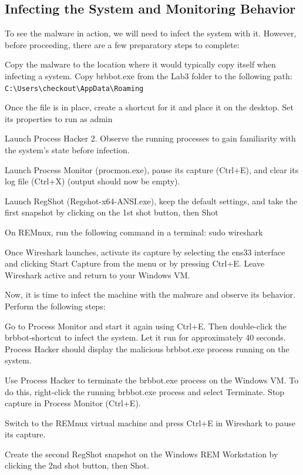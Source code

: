 \documentclass[]{project_plan}
\begin{document}
\subsection{Infecting the System and Monitoring Behavior}
To see the malware in action, we will need to infect the system with it. However,
before proceeding, there are a few preparatory steps to complete:

Copy the malware to the location where it would typically copy itself
when infecting a system. Copy brbbot.exe from the Lab3 folder to the
following path: \lstinline|C:\Users\checkout\AppData\Roaming|

Once the file is in place, create a shortcut for it and place it on the desktop.
Set its properties to run as admin

Launch Process Hacker 2. Observe the running processes to gain familiarity
with the system’s state before infection.

Launch Process Monitor (procmon.exe), pause its capture (Ctrl+E),
and clear its log file (Ctrl+X) (output should now be empty).

Launch RegShot (Regshot-x64-ANSI.exe), keep the default settings,
and take the first snapshot by clicking on the 1st shot button, then
Shot

On REMnux, run the following command in a terminal: sudo wireshark

Once Wireshark launches, activate its capture by selecting the ens33 interface
and clicking Start Capture from the menu or by pressing Ctrl+E.
Leave Wireshark active and return to your Windows VM.

Now, it is time to infect the machine with the malware and observe its
behavior. Perform the following steps:

Go to Process Monitor and start it again using Ctrl+E. Then double-click
the brbbot-shortcut to infect the system. Let it run for approximately 40
seconds. Process Hacker should display the malicious brbbot.exe process
running on the system.

Use Process Hacker to terminate the brbbot.exe process on the Windows
VM. To do this, right-click the running brbbot.exe process and select
Terminate. Stop capture in Process Monitor (Ctrl+E).

Switch to the REMnux virtual machine and press Ctrl+E in Wireshark to
pause its capture.

Create the second RegShot snapshot on the Windows REM Workstation
by clicking the 2nd shot button, then Shot.
\end{document}
